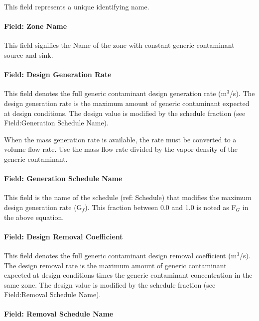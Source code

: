 This field represents a unique identifying name.

\paragraph{Field: Zone Name}\label{field-zone-name-3-002}

This field signifies the Name of the zone with constant generic contaminant source and sink.

\paragraph{Field: Design Generation Rate}\label{field-design-generation-rate-1}

This field denotes the full generic contaminant design generation rate (m\(^{3}\)/s). The design generation rate is the maximum amount of generic contaminant expected at design conditions. The design value is modified by the schedule fraction (see Field:Generation Schedule Name).

When the mass generation rate is available, the rate must be converted to a volume flow rate. Use the mass flow rate divided by the vapor density of the generic contaminant.

\paragraph{Field: Generation Schedule Name}\label{field-generation-schedule-name}

This field is the name of the schedule (ref: Schedule) that modifies the maximum design generation rate (G\(_{f}\)). This fraction between 0.0 and 1.0 is noted as F\(_{G}\) in the above equation.

\paragraph{Field: Design Removal Coefficient}\label{field-design-removal-coefficient}

This field denotes the full generic contaminant design removal coefficient (m\(^{3}\)/s). The design removal rate is the maximum amount of generic contaminant expected at design conditions times the generic contaminant concentration in the same zone. The design value is modified by the schedule fraction (see Field:Removal Schedule Name).

\paragraph{Field: Removal Schedule Name}\label{field-removal-schedule-name}

